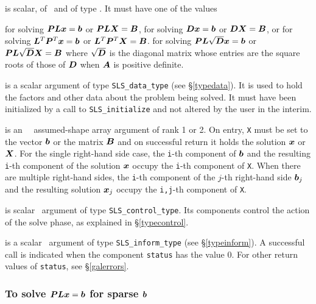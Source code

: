 \documentclass{galahad}
\newcommand{\packagename}{SLS}
\begin{document}
\begin{description}
 is scalar, of \intentin\, and of type \character. It
must have one of the values
\begin{description}
 for solving ${\bm{P}} {\bm{L}} {\bm{x}} =  {\bm{b}}$ or
                     ${\bm{P}} {\bm{L}} {\bm{X}} =  {\bm{B}}$,
 for solving ${\bm{D}} {\bm{x}} =  {\bm{b}}$ or
                  ${\bm{D}} {\bm{X}} =  {\bm{B}}$, or
 for solving ${\bm{L}}^T {\bm{P}}^T {\bm{x}} =  {\bm{b}}$ or
                  ${\bm{L}}^T {\bm{P}}^T {\bm{X}} = {\bm{B}}$.
 for solving ${\bm{P}} {\bm{L}} \sqrt{{\bm{D}}} {\bm{x}} =  {\bm{b}}$ or
                  ${\bm{P}} {\bm{L}} \sqrt{{\bm{D}}} {\bm{X}} =  {\bm{B}}$
where $\sqrt{{\bm{D}}}$ is the diagonal matrix whose entries are the
square roots \hspace*{-4mm} of those of ${\bm{D}}$ when ${\bm{A}}$ is positive definite.

\end{description}

 is a scalar \intentinout argument of type
{\tt \packagename\_data\_type}
(see \S\ref{typedata}). It is used to hold the factors and other
data about the problem being solved.
It must have been initialized by a call to
{\tt \packagename\_ini\-tialize} and not altered by the user in the interim.

 is an \intentinout\ \realdp\ assumed-shape array argument of rank 1 or 2.
On entry, {\tt X} must be set
to the vector ${\bm{b}}$ or the matrix ${\bm{B}}$ and on successful return it holds
the solution ${\bm{x}}$ or ${\bm{X}}$. For the single right-hand side case, the
{\tt i}-th component of ${\bm{b}}$ and the resulting
{\tt i}-th component of the solution ${\bm{x}}$
occupy the {\tt i}-th component of {\tt X}. When there are multiple
right-hand sides, the
{\tt i}-th component of the $j$-th right-hand side ${\bm{b}}_j$
and the resulting solution ${\bm{x}}_j$ occupy the
{\tt i,j}-th component of {\tt X}.

 is scalar \intentin\ argument of type
{\tt \packagename\_control\_type}. Its components control the action
of the solve phase, as explained in
\S\ref{typecontrol}.

 is a scalar \intentinout\ argument of type
{\tt \packagename\_inform\_type}
(see \S\ref{typeinform}).
A successful call is indicated when the  component {\tt status} has the value 0.
For other return values of {\tt status}, see \S\ref{galerrors}.

\end{description}

\subsubsection{To solve ${\bm{P}} {\bm{L}} {\bm{x}} =  {\bm{b}}$ for sparse ${\bm{b}}$}
\label{sparse_solve}
\end{document}
